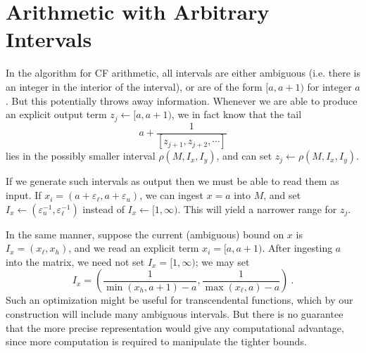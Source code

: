 \documentclass[11pt, oneside]{amsart}   	%
\renewcommand{\:}{\negthickspace:\negthickspace}
\begin{document}
\section{Arithmetic with Arbitrary Intervals}
In the algorithm for CF arithmetic, all intervals are either ambiguous (i.e. there is an integer in the interior of the interval), or are of the form $[a,a+1)$ for integer $a$. But this potentially throws away information.
Whenever we are able to produce an explicit output term $z_j \leftarrow [a,a+1)$, we in fact know that the tail 
\[
a + \frac{1}{[z_{j+1}, z_{j+2},\cdots]}
\]
lies in the possibly smaller interval $\rho(M,I_x, I_y)$, and can set $z_j \leftarrow \rho(M,I_x, I_y)$.

If we generate such intervals as output then we must be able to read them as input. If $x_i = (a+\varepsilon_\ell, a+\varepsilon_u)$, we can ingest $x=a$ into $M$, and set $I_x \leftarrow (\varepsilon_u^{-1}, \varepsilon_\ell^{-1})$ instead of $I_x \leftarrow [1,\infty)$. This will yield a narrower range for $z_j$.

In the same manner, suppose the current (ambiguous) bound on $x$ is $I_x = (x_{\ell}, x_{h})$, and we read an explicit term $x_i = [a,a+1)$. After ingesting $a$ into the matrix, we need not set $I_x = [1,\infty)$; we may set
\[
I_x = \left(\frac{1}{\min(x_h,a+1) - a}, \frac{1}{\max(x_{\ell},a) - a}\right) \ .
\]
Such an optimization might be useful for transcendental functions, which by our construction will include many ambiguous intervals. But there is no guarantee that the more precise representation would give any computational advantage, since more computation is required to manipulate the tighter bounds.





\end{document}
